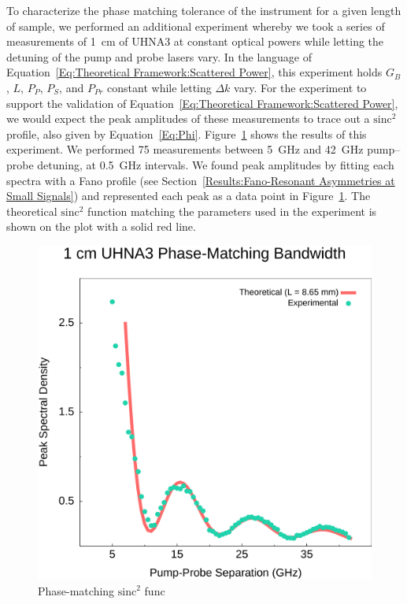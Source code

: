 To characterize the phase matching tolerance of the instrument for a given length of sample, we performed an additional experiment whereby we took a series of measurements of \SI{1}{\centi\meter} of UHNA3 at constant optical powers while letting the detuning of the pump and probe lasers vary. In the language of Equation~\ref{Eq:Theoretical Framework:Scattered Power}, this experiment holds \(G_B\), \(L\), \(P_P\), \(P_S\), and \(P_{Pr}\) constant while letting \(\Delta k\) vary. For the experiment to support the validation of Equation~\ref{Eq:Theoretical Framework:Scattered Power}, we would expect the peak amplitudes of these measurements to trace out a \(\mathrm{sinc^2}\) profile, also given by Equation~\ref{Eq:Phi}. Figure~\ref{fig:Phase-Match} shows the results of this experiment. We performed 75 measurements between \SI{5}{\giga\hertz} and \SI{42}{\giga\hertz} pump--probe detuning, at \SI{0.5}{\giga\hertz} intervals. We found peak amplitudes by fitting each spectra with a Fano profile (see Section~\ref{Results:Fano-Resonant Asymmetries at Small Signals}) and represented each peak as a data point in Figure~\ref{fig:Phase-Match}. The theoretical \(\mathrm{sinc^2}\) function matching the parameters used in the experiment is shown on the plot with a solid red line.


\begin{figure}[t!]
\centering
\includegraphics[width=\textwidth]{figs/3-CoBS/Phase-Match.pdf}
\caption{Phase-matching \(\mathrm{sinc^2}\) func}
\label{fig:Phase-Match}
\end{figure}

